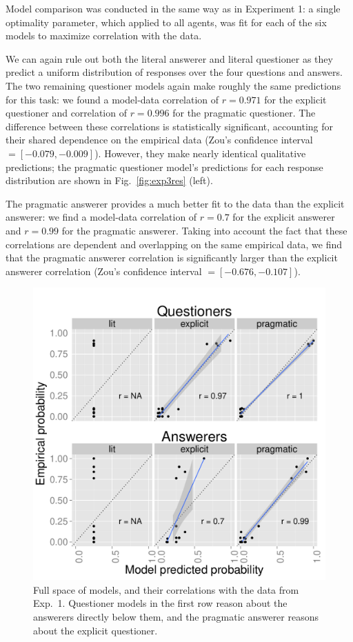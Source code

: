 \documentclass[12pt, floatsintext, jou]{apa6}
\begin{document}
Model comparison was conducted in the same way as in Experiment 1: a single optimality parameter, which applied to all agents, was fit for each of the six models to maximize correlation with the data.

We can again rule out both the literal answerer and literal questioner as they predict a uniform distribution of responses over the four questions and answers. The two remaining questioner models again make roughly the same predictions for this task:
we found a model-data correlation of $r = 0.971$ for the explicit questioner and correlation of $r = 0.996$ for the pragmatic questioner. The difference between these correlations is statistically significant, accounting for their shared dependence on the empirical data (Zou's confidence interval $= [-0.079, -0.009]$). However, they make nearly identical qualitative predictions; the pragmatic questioner model's predictions for each response distribution are shown in Fig.~\ref{fig:exp3res} (left). 

The pragmatic answerer provides a much better fit to the data than the explicit answerer: we find a model-data correlation of $r = 0.7$ for the explicit answerer and $r = 0.99$ for the pragmatic answerer.  Taking into account the fact that these correlations are dependent and overlapping on the same empirical data, we find that the pragmatic answerer correlation is significantly larger than the explicit answerer correlation (Zou's confidence interval $= [-0.676, -0.107]$). 
%
\begin{figure}[t!]
\begin{center}
\includegraphics[scale=.75]{Exp3ModelFits.pdf}
\end{center}
\caption{Full space of models, and their correlations with the data from Exp.~1. Questioner models in the first row reason about the answerers directly below them, and the pragmatic answerer reasons about the explicit questioner.}
\label{fig:Exp3ModelSpace}
\end{figure}
%
\end{document}
